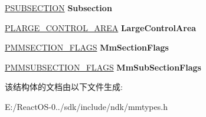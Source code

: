 \begin{DoxyCompactItemize}
\hyperlink{struct___s_u_b_s_e_c_t_i_o_n}{P\+S\+U\+B\+S\+E\+C\+T\+I\+ON} {\bfseries Subsection}
\item 
\mbox{\label{struct___s_e_g_m_e_n_t___o_b_j_e_c_t_a4b93deaa5dab8762c52bf3d9cda30445}} 
\hyperlink{struct___l_a_r_g_e___c_o_n_t_r_o_l___a_r_e_a}{P\+L\+A\+R\+G\+E\+\_\+\+C\+O\+N\+T\+R\+O\+L\+\_\+\+A\+R\+EA} {\bfseries Large\+Control\+Area}
\item 
\mbox{\label{struct___s_e_g_m_e_n_t___o_b_j_e_c_t_a4e20072ad532b6a76cf34626d634badb}} 
\hyperlink{struct___m_m_s_e_c_t_i_o_n___f_l_a_g_s}{P\+M\+M\+S\+E\+C\+T\+I\+O\+N\+\_\+\+F\+L\+A\+GS} {\bfseries Mm\+Section\+Flags}
\item 
\mbox{\label{struct___s_e_g_m_e_n_t___o_b_j_e_c_t_a3fc1d72d08838ab2e2601595a6f018c5}} 
\hyperlink{struct___m_m_s_u_b_s_e_c_t_i_o_n___f_l_a_g_s}{P\+M\+M\+S\+U\+B\+S\+E\+C\+T\+I\+O\+N\+\_\+\+F\+L\+A\+GS} {\bfseries Mm\+Sub\+Section\+Flags}
\end{DoxyCompactItemize}


该结构体的文档由以下文件生成\+:\begin{DoxyCompactItemize}
\item 
E\+:/\+React\+O\+S-\/0../sdk/include/ndk/mmtypes.\+h\end{DoxyCompactItemize}
